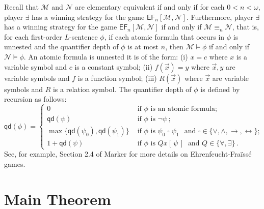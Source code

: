 \documentclass[10pt,a4paper, openany,  oldfontcommands]{memoir}
\newtheorem{open problem} [theorem] {Open Problem}
\newtheorem{open question} [theorem] {Open Question}
\begin{document}
Recall that $  \mathcal{M} $ and $   \mathcal{N} $ are elementary equivalent  if and only if  for each  $ 0 < n  <  \omega $, 
player $  \exists $  has a winning strategy for the game
$  \mathsf{EF}_n  \left[    \mathcal{M}  ,  \mathcal{N}   \right] $.
Furthermore,  player  $  \exists  $  has a winning strategy for the game   $  \mathsf{EF}_n  \left[    \mathcal{M}  ,  \mathcal{N}   \right] $
if and only if   $  \mathcal{M}  \equiv_n   \mathcal{N} $, that is, 
 for each first-order   $L$-sentence   $  \phi $, 
if each atomic formula that occurs in    $  \phi $ is unnested and the quantifier depth of $  \phi $  is  at most  $    n $, 
then $  \mathcal{M} \models  \phi $  if and only if    $  \mathcal{N} \models  \phi $. 
An atomic formula is unnested it is of the form: 
(i)  $  x = c   $  where $x$  is a variable  symbol and $c$ is a constant symbol; 
(ii) $  f (  \vec{x} )  =  y  $  where  $  \vec{x} , y $  are variable symbols  and $f$ is a function symbol; 
(iii) $  R (  \vec{x} )  $  where  $  \vec{x} $  are variable symbols and  $R$ is a relation symbol. 
 The quantifier depth of  $  \phi $ is defined by recursion as follows: 
 \[
 \mathsf{qd} \left(  \phi  \right)   =   \begin{cases}
 0              &   \mbox{  if  }    \phi   \mbox{ is an atomic formula; }
 \\
  \mathsf{qd} \left(  \psi  \right)       &   \mbox{  if  }    \phi   \mbox{ is  }  \neg  \psi \,  ;  
   \\
\max \lbrace  \mathsf{qd} \left(  \psi_0   \right)   ,    \mathsf{qd} \left(  \psi_1   \right)  \rbrace      &   \mbox{  if  }    \phi   \mbox{ is  }   \psi_0  \;  \square  \;  \psi_1 \,    \   \mbox{  and  }  \square  \in  \lbrace \vee,  \wedge ,  \rightarrow,  \leftrightarrow  \rbrace   ;  
   \\
1 + \mathsf{qd} \left(  \psi   \right)        &   \mbox{  if  }    \phi   \mbox{ is  }     Q x  \left[  \,   \psi  \,  \right]     
\   \mbox{  and  }     Q  \in  \lbrace  \forall ,  \exists   \rbrace
 \,          .
 \end{cases}
 \]
See, for example,  Section 2.4 of  Marker  \cite{Marker2002} for more details on    Ehrenfeucht-Fra\"iss\'e games.














\section{Main Theorem}
\end{document}
